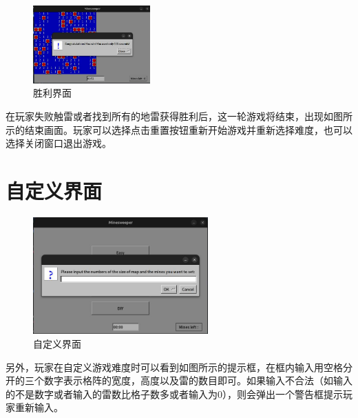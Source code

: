 \documentclass{article}
\begin{document}
\begin{CJK}{UTF8}{gbsn}
\begin{figure}[h]
    \centering
    \includegraphics[width=0.4\textwidth]{test8.jpg}
    \caption{胜利界面}
    \label{fig:example4}
\end{figure}

在玩家失败触雷或者找到所有的地雷获得胜利后，这一轮游戏将结束，出现如图所示的结束画面。玩家可以选择点击重置按钮重新开始游戏并重新选择难度，也可以选择关闭窗口退出游戏。

\section{自定义界面}

\begin{figure}[h]
    \centering
    \includegraphics[width=0.6\textwidth]{test7.jpg}
    \caption{自定义界面}
    \label{fig:example5}
\end{figure}

另外，玩家在自定义游戏难度时可以看到如图所示的提示框，在框内输入用空格分开的三个数字表示格阵的宽度，高度以及雷的数目即可。如果输入不合法（如输入的不是数字或者输入的雷数比格子数多或者输入为0），则会弹出一个警告框提示玩家重新输入。





\end{CJK}
\end{document}
